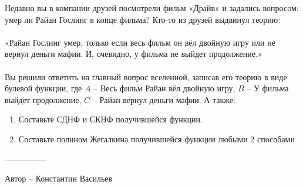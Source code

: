 \question
Недавно вы в компании друзей посмотрели фильм «Драйв» и задались вопросом: умер ли Райан Гослинг в конце фильма? Кто-то из друзей выдвинул теорию:
\\
\\
«Райан Гослинг умер, только если весь фильм он вёл двойную игру или не вернул деньги мафии. И, очевидно, у фильма не выйдет продолжение.»
\\
\\
Вы решили ответить на главный вопрос вселенной, записав его теорию в виде булевой функции, где $A$ – Весь фильм Райан вёл двойную игру, $B$ – У фильма выйдет продолжение, $C$ – Райан вернул деньги мафии. А также:
\begin{enumerate}
    \item Составьте СДНФ и СКНФ получившейся функции.
    \item Составьте полином Жегалкина получившейся функции любыми 2 способами
\end{enumerate}

---------------

Автор -- Константин Васильев